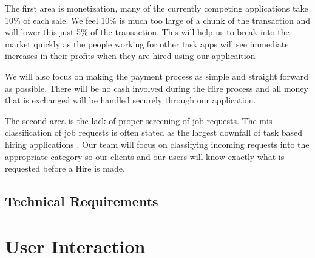 \documentclass[11pt]{article}
\begin{document}
The first area is monetization, many of the currently competing applications take 10\% of each sale. 
We feel 10\% is much too large of a chunk of the transaction and will lower this just 5\% of the transaction. 
This will help us to break into the market quickly as the people working for other task apps will see immediate increases in their profits when they are hired using our applicaition

We will also focus on making the payment process as simple and straight forward as possible. 
There will be no cash involved during the Hire process and all money that is exchanged will be handled securely through our application.

The second area is the lack of proper screening of job requests. 
The mis-classification of job requests is often stated as the largest downfall of task based hiring applications \cite{ThumbTack_sucks}. 
Our team will focus on classifying incoming requests into the appropriate category so our clients and our users will know exactly what is requested before a Hire is made.

\subsection{Technical Requirements}


%
\section{User Interaction}\label{user-interaction}
\end{document}
